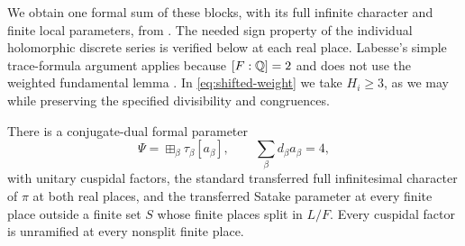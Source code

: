 We obtain one formal sum of these blocks, with its full infinite
character and finite local parameters, from
\citet[Corollary~5.3]{Labesse2011CM}.  The needed sign property of the
individual holomorphic discrete series is verified below at each real
place.  Labesse's simple trace-formula argument applies because
$[F:\mathbb Q]=2$ and does not use the weighted fundamental lemma
\citep[Sections~4.8 and~5.1]{Labesse2011CM}.
In \cref{eq:shifted-weight} we take $H_i\geq3$, as we may while
preserving the specified divisibility and congruences.

\begin{lemma}
\label{lem:weak-transfer}
There is a conjugate-dual formal parameter
\[
 \Psi=\boxplus_\beta\tau_\beta[a_\beta],
 \qquad \sum_\beta d_\beta a_\beta=4,
\]
with unitary cuspidal factors, the standard transferred full
infinitesimal character of $\pi$ at both real places, and the
transferred Satake parameter at every finite place outside a finite
set $S$ whose finite places split in $L/F$.
Every cuspidal factor is unramified at every nonsplit finite place.
\end{lemma}
